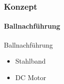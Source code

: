 \begin{frame}
    \frametitle{Konzept}
    \framesubtitle{Ballnachführung}
    \begin{block}{Ballnachführung}
        \begin{itemize}
            \item Stahlband
            \item DC Motor
        \end{itemize}
    \end{block}
\end{frame}

